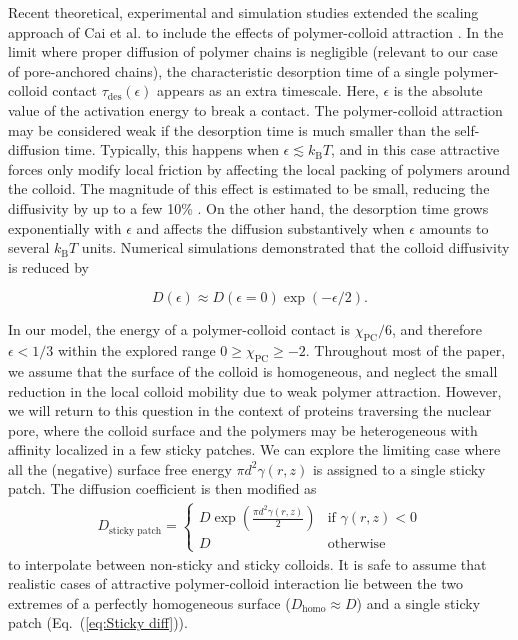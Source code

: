 \documentclass[12pt, a4paper]{article}
\begin{document}
Recent theoretical, experimental and simulation studies extended the scaling approach of Cai et al. \cite{Cai2011} to include the effects of polymer-colloid attraction \cite{Yamamoto2018, Carroll2018}.
In the limit where proper diffusion of polymer chains is negligible (relevant to our case of pore-anchored chains), the characteristic desorption time of a single polymer-colloid contact $\tau_\text{des}(\epsilon)$ appears as an extra timescale.
Here, $\epsilon$ is the absolute value of the activation energy to break a contact.
The polymer-colloid attraction may be considered weak if the desorption time is much smaller than the self-diffusion time.
Typically, this happens when $\epsilon \lesssim k_\text{B} T$, and in this case attractive forces only modify local friction by affecting the local packing of polymers around the colloid.
The magnitude of this effect is estimated to be small, reducing the diffusivity by up to a few 10\% \cite{Yamamoto2011}.
On the other hand, the desorption time grows exponentially with $\epsilon$ and affects the diffusion substantively when $\epsilon$ amounts to several $k_\text{B} T$ units.
Numerical simulations demonstrated that the colloid diffusivity is reduced by \cite{Yamamoto2018}

\begin{equation}
    D(\epsilon)\approx D(\epsilon=0) \exp (-\epsilon / 2).
    \label{eq:Yamamoto}
\end{equation}

In our model, the energy of a polymer-colloid contact is $\chi_{\text{PC}}/6$, and therefore $\epsilon < 1/3$ within the explored range $0\geq\chi_{\text{PC}}\geq-2$.
Throughout most of the paper, we assume that the surface of the colloid is homogeneous, and neglect the small reduction in the local colloid mobility due to weak polymer attraction.
However, we will return to this question in the context of proteins traversing the nuclear pore, where the colloid surface and the polymers may be heterogeneous with affinity localized in a few sticky patches.
We can explore the limiting case where all the (negative) surface free energy $\pi d^2 \gamma(r,z)$ is assigned to a single sticky patch.
The diffusion coefficient is then modified as
\begin{eqnarray}
    D_{\text{sticky patch}} = 
    \begin{cases}
        D \exp(\frac{\pi d^2 \gamma(r,z)}{2}) & \text{if } \gamma(r,z) < 0 \\
        D & \text{otherwise}
    \end{cases}
     \label{eq:Sticky diff}
\end{eqnarray}
to interpolate between non-sticky and sticky colloids.
It is safe to assume that realistic cases of attractive polymer-colloid interaction lie between the two extremes of a perfectly homogeneous surface ($D_\text{homo} \approx D$) and a single sticky patch (Eq.~(\ref{eq:Sticky diff})).
\end{document}
